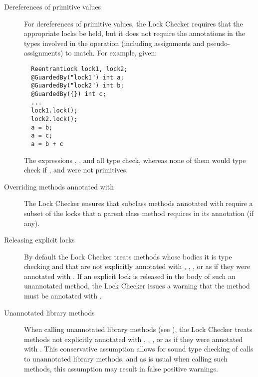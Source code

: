 \begin{description}
\item[Dereferences of primitive values]
  For dereferences of primitive values, the Lock Checker requires that
  the appropriate locks be held, but it does not require the annotations
  in the types involved in the operation (including assignments and
  pseudo-assignments) to match. For example, given:
  \begin{verbatim}
  ReentrantLock lock1, lock2;
  @GuardedBy("lock1") int a;
  @GuardedBy("lock2") int b;
  @GuardedBy({}) int c;
  ...
  lock1.lock();
  lock2.lock();
  a = b;
  a = c;
  a = b + c
  \end{verbatim}
  The expressions , , and 
  all type check, whereas none of them would type check if ,
   and  were not primitives.

\item[Overriding methods annotated with ]
  The Lock Checker ensures that subclass methods annotated with
   require a subset of the locks that a parent
  class method requires in its  annotation (if any).

\item[Releasing explicit locks]
  By default the Lock Checker treats methods whose bodies it is type checking and
  that are not explicitly annotated with , ,
  ,  or 
  as if they were annotated with .  If an explicit lock is
  released in the body of such an unannotated method, the Lock Checker issues a warning that the
  method must be annotated with .

\item[Unannotated library methods]
  When calling unannotated library methods (see ),
  the Lock Checker treats methods not explicitly annotated with ,
  , ,  or 
  as if they were annotated with .
  This conservative assumption allows for sound type checking of calls to
  unannotated library methods, and as is usual when calling such methods,
  this assumption may result in false positive warnings.


\end{description}
